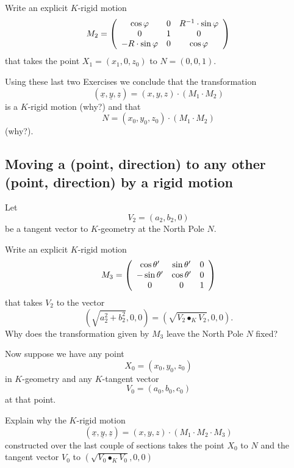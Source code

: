 \documentclass{ximera}
\begin{document}
\begin{exercise}
 Write an explicit $K$-rigid motion%
\[
M_{2}=\left(
\begin{array}
[c]{ccc}%
\cos\varphi & 0 & R^{-1}\cdot \sin %
\varphi\\
0 & 1 & 0\\
-R\cdot \sin \varphi & 0 & \cos\varphi
\end{array}
\right)
\]
that takes the point $X_{1}=\left(  x_{1},0,z_{0}\right)  $ to $N=\left(
0,0,1\right)  $.
\end{exercise}

Using these last two Exercises we conclude that the transformation%
\[
\left(  \underline{x},\underline{y},\underline{z}\right)  =\left(
x,y,z\right)  \cdot\left(  M_{1}\cdot M_{2}\right)
\]
is a $K$-rigid motion (why?) and that%
\[
N=\left(  x_{0},y_{0},z_{0}\right)  \cdot\left(  M_{1}\cdot M_{2}\right)
\]
(why?).



\subsection*{Moving a (point, direction) to any other (point, direction) by a
rigid motion}

Let
\[
V_{2}=\left(  a_{2},b_{2},0\right)
\]
be a tangent vector to $K$-geometry at the North Pole $N$.

\begin{exercise}
 Write an explicit $K$-rigid motion%
\[
M_{3}=\left(
\begin{array}
[c]{ccc}%
\cos\theta' & \sin \theta' & 0\\
-\sin \theta' & \cos\theta' & 0\\
0 & 0 & 1
\end{array}
\right)
\]
that takes $V_{2}$ to the vector%
\[
\left(  \sqrt{a_{2}^{2}+b_{2}^{2}},0,0\right)  =\left(  \sqrt{V_{2}\bullet
_{K}V_{2}},0,0\right)  .
\]
Why does the transformation given by $M_{3}$ leave the North Pole $N$ fixed?
\end{exercise}

Now suppose we have any point%
\[
X_{0}=\left(  x_{0},y_{0},z_{0}\right)
\]
in $K$-geometry and any $K$-tangent vector%
\[
V_{0}=\left(  a_{0},b_{0},c_{0}\right)
\]
at that point.

\begin{exercise}
 Explain why the $K$-rigid motion%
\[
\left(  \underline{x},\underline{y},\underline{z}\right)  =\left(
x,y,z\right)  \cdot\left(  M_{1}\cdot M_{2}\cdot M_{3}\right)
\]
constructed over the last couple of sections takes the point $X_{0}$ to $N$
and the tangent vector $V_{0}$ to $\left(  \sqrt{V_{0}\bullet_{K}V_{0}%
},0,0\right)  $
\end{exercise}
\end{document}
